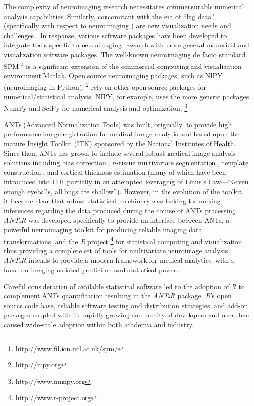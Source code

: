 \documentclass[final,5p,times,twocolumn]{elsarticle}
\begin{document}
The complexity of neuroimaging research necessitates 
commensurable numerical analysis capabilities.  Similarly, concomitant
with the era of ``big data'' (specifically with respect to neuroimaging
\citep{vanhorn2013}) are new visualization needs and challenges
\citep{childs2013,kehrer2013}.
In response, various software packages have been developed to
integrate tools specific to neuroimaging research with more general
numerical and visualization software packages.
The well-known neuroimaging de facto standard SPM%
\footnote{
http://www.fil.ion.ucl.ac.uk/spm/
}
is a significant extension of the commercial computing and visualization environment
Matlab.  Open source neuroimaging packages, such as NIPY (neuroimaging in Python),%
\footnote{
http://nipy.org
} 
rely on other open source packages for numerical/statistical analysis.  NIPY,
for example, uses the more generic packages NumPy and SciPy for numerical analysis and 
optimization.%
\footnote{
http://www.numpy.org
}  

ANTs (Advanced Normalization Tools) was built, originally, to provide 
high performance image registration for medical image analysis
\citep{avants2008a} and based upon the mature Insight Toolkit (ITK)
sponsored by the National Institutes of Health.  Since then, ANTs has grown to include 
several robust medical image analysis solutions including bias 
correction \citep{tustison2010}, $n$-tissue multivariate segmentation 
\citep{avants2011}, template construction \citep{avants2010}, and cortical 
thickness estimation \citep{das2009} (many of which have been
introduced into ITK partially in an attempted leveraging of Linus's Law---``Given enough eyeballs, all bugs are shallow'').  
However, in the evolution of the toolkit, it became clear 
that robust statistical machinery was lacking for making inferences regarding
the data produced during the course of ANTs processing.  \textit{ANTsR} was developed
specifically to provide an interface between ANTs, a 
powerful neuroimaging toolkit for producing reliable imaging data 
transformations, and the \textit{R} project%
\footnote{
http://www.r-project.org
}
for statistical computing and visualization thus providing a complete
set of tools for multivariate neuroimage analysis \textit{ANTsR} intends to provide a modern framework for medical analytics, with a focus on imaging-assisted prediction and statistical power.


Careful consideration of available statistical software 
led to the adoption of \textit{R} to complement ANTs quantification resulting in the
\textit{ANTsR} package.
\textit{R}'s open source code base, reliable software testing and distribution strategies,
and add-on packages coupled with its rapidly growing 
community of developers and users has caused wide-scale
adoption within both academia and industry.
\end{document}
